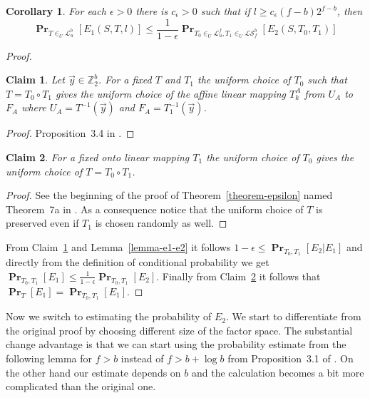\documentclass{article}
\newcommand{\vecspace}[2]{\mathbb{Z}_{#1}^{#2}}
\newcommand{\binvecspace}[1]{\vecspace{2}{#1}}
\newcommand{\linearmaps}[2]{\mathcal{L}_{#1}^{#2}}
\newcommand{\surjectivelinearmaps}[2]{\mathcal{LS}_{#1}^{#2}}
\newcommand{\probs}[2]{\operatorname{\mathbf{Pr}}_{{#1}}\left[{#2}\right]}
\newtheorem{claim}{Claim}
\newtheorem{corollary}{Corollary}
\begin{document}
\begin{corollary}
\label{corollary-e1-e2}
For each $\epsilon > 0$ there is $c_\epsilon > 0$ such that if $l \geq c_\epsilon (f - b)2^{f-b}$, then
\[
\probs{T \in_U \linearmaps{u}{b}}{E_1(S, T, l)} \leq \frac{1}{1 - \epsilon}\probs{T_0 \in_U \linearmaps{u}{f}, T_1 \in_U \surjectivelinearmaps{f}{b}}{E_2(S, T_0, T_1)}
\]
\end{corollary}
\begin{proof}
\begin{claim}
\label{claim-dstr-affine}
Let $\vec{y} \in \binvecspace{b}$. For a fixed $T$ and $T_1$ the uniform choice of $T_0$ such that $T = T_0 \circ T_1$ gives the uniform choice of the affine linear mapping $T_k^A$ from $U_A$ to $F_A$ where $U_A = T^{-1}(\vec{y})$ and $F_A = T_1^{-1}(\vec{y})$.
\end{claim}
\begin{proof}
Proposition~3.4 in \cite{alonetal}.
\end{proof}
\begin{claim}
\label{claim-dstr-factor}
For a fixed onto linear mapping $T_1$ the uniform choice of $T_0$ gives the uniform choice of $T = T_0 \circ T_1$.
\end{claim}
\begin{proof}
See the beginning of the proof of Theorem~\ref{theorem-epsilon} named Theorem~7a in \cite{alonetal}.
As a consequence notice that the uniform choice of $T$ is preserved even if $T_1$ is chosen randomly as well.
\end{proof}
From Claim~\ref{claim-dstr-affine} and Lemma~\ref{lemma-e1-e2} it follows $1 - \epsilon \leq \probs{T_0, T_1}{E_2 | E_1}$ and directly from the definition of conditional probability we get $\probs{T_0, T_1}{E_1} \leq \frac{1}{1-\epsilon}\probs{T_0, T_1}{E_2}$.
Finally from Claim~\ref{claim-dstr-factor} it follows that $\probs{T}{E_1} = \probs{T_0, T_1}{E_1}$.
\end{proof}

Now we switch to estimating the probability of $E_2$. 
We start to differentiate from the original proof by choosing different size of the factor space.
The substantial change advantage is that we can start using the probability estimate from the following lemma for $f > b$ instead of $f > b + \log b$  from Proposition~3.1 of \cite{alonetal}.
On the other hand our estimate depends on $b$ and the calculation becomes a bit more complicated than the original one.
\end{document}
